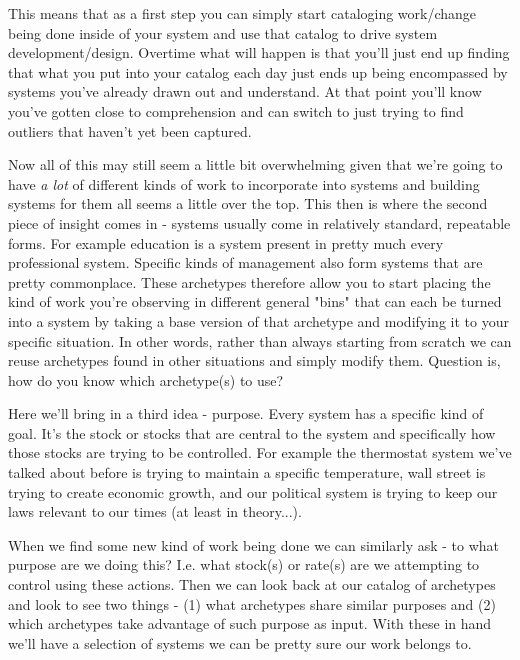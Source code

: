 \documentclass[11pt,a5paper]{book}
\begin{document}
This means that as a first step you can simply start cataloging work/change being done inside of your system and use that catalog to drive system development/design. Overtime what will happen is that you'll just end up finding that what you put into your catalog each day just ends up being encompassed by systems you've already drawn out and understand. At that point you'll know you've gotten close to comprehension and can switch to just trying to find outliers that haven't yet been captured. 
\newline

Now all of this may still seem a little bit overwhelming given that we're going to have \textit{a lot} of different kinds of work to incorporate into systems and building systems for them all seems a little over the top. This then is where the second piece of insight comes in - systems usually come in relatively standard, repeatable forms. For example education is a system present in pretty much every professional system. Specific kinds of management also form systems that are pretty commonplace. These archetypes therefore allow you to start placing the kind of work you're observing in different general "bins" that can each be turned into a system by taking a base version of that archetype and modifying it to your specific situation. In other words, rather than always starting from scratch we can reuse archetypes found in other situations and simply modify them. Question is, how do you know which archetype(s) to use?
\newline

Here we'll bring in a third idea - purpose. Every system has a specific kind of goal. It's the stock or stocks that are central to the system and specifically how those stocks are trying to be controlled. For example the thermostat system we've talked about before is trying to maintain a specific temperature, wall street is trying to create economic growth, and our political system is trying to keep our laws relevant to our times (at least in theory...). 
\newline

When we find some new kind of work being done we can similarly ask - to what purpose are we doing this? I.e. what stock(s) or rate(s) are we attempting to control using these actions. Then we can look back at our catalog of archetypes and look to see two things - (1) what archetypes share similar purposes and (2) which archetypes take advantage of such purpose as input. With these in hand we'll have a selection of systems we can be pretty sure our work belongs to.
\newline
\end{document}
